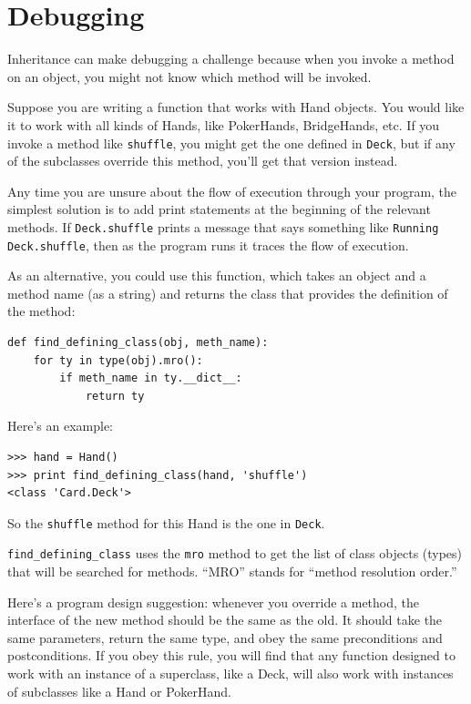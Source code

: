 \documentclass[10pt]{book}
\begin{document}
\begin{CJK}{UTF8}{gbsn}
\begin{exercise}
\end{exercise}


\section{Debugging}

Inheritance can make debugging a challenge because when you
invoke a method on an object, you might not know which method
will be invoked.

Suppose you are writing a function that works with Hand objects.
You would like it to work with all kinds of Hands, like
PokerHands, BridgeHands, etc.  If you invoke a method like
{\tt shuffle}, you might get the one defined in {\tt Deck},
but if any of the subclasses override this method, you'll
get that version instead.  

Any time you are unsure about the flow of execution through your
program, the simplest solution is to add print statements at the
beginning of the relevant methods.  If {\tt Deck.shuffle} prints a
message that says something like {\tt Running Deck.shuffle}, then as
the program runs it traces the flow of execution.

As an alternative, you could use this function, which takes an
object and a method name (as a string) and returns the class that
provides the definition of the method:

\begin{verbatim}
def find_defining_class(obj, meth_name):
    for ty in type(obj).mro():
        if meth_name in ty.__dict__:
            return ty
\end{verbatim}
%
Here's an example:

\begin{verbatim}
>>> hand = Hand()
>>> print find_defining_class(hand, 'shuffle')
<class 'Card.Deck'>
\end{verbatim}
%
So the {\tt shuffle} method for this Hand is the one in {\tt Deck}.

\verb"find_defining_class" uses the {\tt mro} method to get the list
of class objects (types) that will be searched for methods.  ``MRO''
stands for ``method resolution order.''

Here's a program design suggestion: whenever you override a method,
the interface of the new method should be the same as the old.  It
should take the same parameters, return the same type, and obey the
same preconditions and postconditions.  If you obey this rule, you
will find that any function designed to work with an instance of a
superclass, like a Deck, will also work with instances of subclasses
like a Hand or PokerHand.


\end{CJK}
\end{document}
